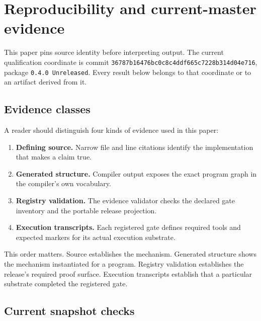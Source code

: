 \documentclass[11pt,oneside]{article}
\begin{document}
\section{Reproducibility and current-master evidence}
\label{sec:validation}

This paper pins source identity before interpreting output. The current
qualification coordinate is commit
\texttt{36787b16476bc0c8c4ddf665c7228b314d04e716}, package
\texttt{0.4.0 Unreleased}. Every result below belongs to that coordinate or to
an artifact derived from it.

\subsection{Evidence classes}

A reader should distinguish four kinds of evidence used in this paper:

\begin{enumerate}
  \item \textbf{Defining source.} Narrow file and line citations identify the
        implementation that makes a claim true.
  \item \textbf{Generated structure.} Compiler output exposes the exact
        program graph in the compiler's own vocabulary.
  \item \textbf{Registry validation.} The evidence validator checks the
        declared gate inventory and the portable release projection.
  \item \textbf{Execution transcripts.} Each registered gate defines required
        tools and expected markers for its actual execution substrate.
\end{enumerate}

This order matters. Source establishes the mechanism. Generated structure
shows the mechanism instantiated for a program. Registry validation establishes
the release's required proof surface. Execution transcripts establish that a
particular substrate completed the registered gate.

\subsection{Current snapshot checks}
\end{document}
